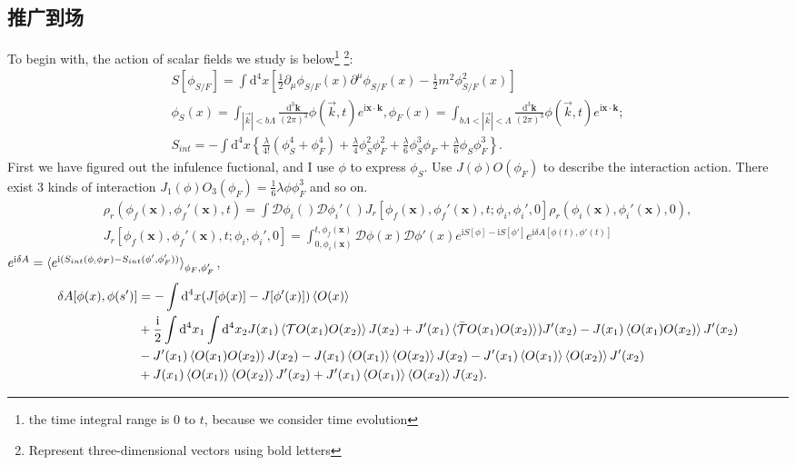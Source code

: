 \documentclass{article}
\newcommand{\D}[0]{\mathrm{d}}
\renewcommand{\I}[0]{\mathrm{i}}
\begin{document}
\subsection{推广到场}
To begin with, the action of scalar fields we study is below\footnote{the time integral range is 0 to $t$, because we consider time evolution} \footnote{Represent three-dimensional vectors using bold letters}:
\begin{equation}
\begin{split}
     S[\phi_{S/F}]=\int \D^4x \left[\frac{1}{2}\partial_\mu\phi_{S/F}(x)\partial^\mu\phi_{S/F}(x)-\frac{1}{2}m^2\phi_{S/F}^2(x)\right]\\
     \phi_S(x)=\int_{|\vec{k}|<b\Lambda}\frac{\D^3\boldsymbol{k}}{(2\pi)^3}\phi(\vec{k},t)e^{\I \boldsymbol{x}\cdot\boldsymbol{k}},
     \phi_F(x)=\int_{b\Lambda<|\vec{k}|<\Lambda}\frac{\D^3\boldsymbol{k}}{(2\pi)^3}\phi(\vec{k},t)e^{\I \boldsymbol{x}\cdot\boldsymbol{k}};\\
     S_{int}=-\int\D^4x\left\{\frac{\lambda}{4!}(\phi_S^4+\phi_F^4)+\frac{\lambda}{4}\phi_S^2\phi_F^2+\frac{\lambda}{6}\phi_S^3\phi_F+\frac{\lambda}{6}\phi_S\phi_F^3\right\}.
\end{split}
\end{equation}
First we have figured out the infulence fuctional, and I use $\phi$ to express $\phi_S$. Use $J(\phi)O(\phi_F)$ to describe the interaction action. There exist 3 kinds of interaction $J_1(\phi)O_3(\phi_F)=\frac{1}{6}\lambda\phi\phi_F^3$ and so on. 
\begin{equation}
    \begin{split} \rho_r(\phi_f(\boldsymbol{x}),\phi_f'(\boldsymbol{x}),t)=\int\mathcal{D}\phi_i()\mathcal{D}\phi_i'() J_r[\phi_f(\boldsymbol{x}),\phi_f'(\boldsymbol{x}),t;\phi_i,\phi_i',0]\rho_r(\phi_i(\boldsymbol{x}),\phi_i'(\boldsymbol{x}),0),\\
    J_r[\phi_f(\boldsymbol{x}),\phi_f'(\boldsymbol{x}),t;\phi_i,\phi_i',0]=\int_{0,\phi_i(\boldsymbol{x})}^{t,\phi_f(\boldsymbol{x})}\mathcal{D}\phi(x)\mathcal{D}\phi'(x) e^{\I S[\phi]-\I S[\phi']}e^{\I\delta A[\phi(t),\phi'(t)]}
    \end{split}
\end{equation}
$e^{\I\delta A}=\braket{e^{\I(S_{int}(\phi_;\phi_F)-S_{int}(\phi',\phi_F'))}}_{\phi_F,\phi_F'}$,
\begin{equation}
\begin{split}
     \delta A[\phi(x),\phi(s')]&=-\int\D^4 x (J[\phi(x)]-J[\phi'(x)])\braket{O(x)}\\&+\frac{\I}{2}\int \D^4x_1\int\D^4 x_2 J(x_1)\braket{\mathcal{T}O(x_1)O(x_2)}J(x_2)+J'(x_1)\braket{\bar{\mathcal{T}}O(x_1)O(x_2)})J'(x_2)
    -J(x_1)\braket{O(x_1)O(x_2)}J'(x_2)\\&-J'(x_1)\braket{O(x_1)O(x_2)}J(x_2)-J(x_1)\braket{O(x_1)}\braket{O(x_2)}J(x_2)-J'(x_1)\braket{O(x_1)}\braket{O(x_2)}J'(x_2)\\
    &+J(x_1)\braket{O(x_1)}\braket{O(x_2)}J'(x_2)+J'(x_1)\braket{O(x_1)}\braket{O(x_2)}J(x_2).
\end{split}
\end{equation}
\end{document}
